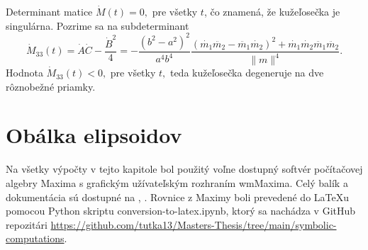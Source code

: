 Determinant matice $\dot{M}(t) = 0, $ pre všetky $t$, čo znamená, že kužeľosečka je singulárna.
Pozrime sa na subdeterminant
$$
\dot{M}_{33}(t) = \dot{A} \dot{C} - \frac{\dot{B}^2}{4} =  -\frac{(b^2 - a^2)^2}{a^4b^4} \frac{ (\dot{m_1}\ddot{m_2} - \ddot{m_1}\dot{m_2})^2 + \dot{m_1}\dot{m_2}\ddot{m_1}\ddot{m_2}}{\|m\|^4}.
$$ 
Hodnota $\dot{M}_33(t) < 0, $ pre všetky $t,$ teda kužeľosečka degeneruje na dve rôznobežné priamky.

\section{Obálka elipsoidov}

Na všetky výpočty v tejto kapitole bol použitý voľne dostupný softvér počítačovej algebry Maxima s grafickým užívateľským rozhraním wmMaxima. Celý balík a dokumentácia sú dostupné na \cite{MaximaDoc}, \cite{MaximaDownload}. Rovnice z Maximy boli prevedené do \LaTeX u pomocou Python skriptu conversion-to-latex.ipynb, ktorý sa nachádza v GitHub repozitári \url{https://github.com/tutka13/Masters-Thesis/tree/main/symbolic-computations}.


